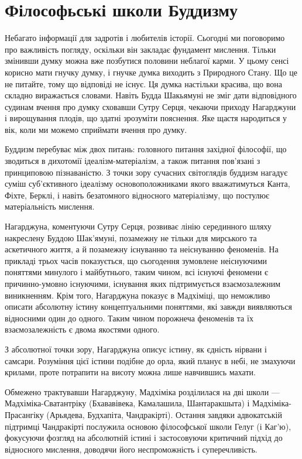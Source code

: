 \section{Філософьські школи Буддизму}

Небагато інформації для задротів і любителів історії. Сьогодні
ми поговоримо про важливість погляду, оскільки він закладає фундамент мислення.
Тільки змінивши думку можна вже позбутися половини неблагої карми.
У цьому сенсі корисно мати гнучку думку, і гнучке думка виходить з
Природного Стану. Що це не питайте, тому що відповіді не існує.
Ця думка настільки красива, що вона складно виражається словами.
Навіть Будда Шакьямуні не зміг дати відповідного судинам вчення про думку
сховавши Сутру Серця, чекаючи приходу Нагарджуни і вирощування плодів, що здатні зрозуміти пояснення.
Яке щастя народиться у вік, коли ми можемо сприймати вчення про думку.

Буддизм перебуває між двох питань: головного питання західної філософії,
що зводиться в дихотомії ідеалізм-матеріалізм, а також питання пов'язані
з принциповою пізнаваністю. З точки зору сучасних світоглядів буддизм
нагадує суміш суб'єктивного ідеалізму основоположниками якого вважатимуться
Канта, Фіхте, Берклі, і навіть безатомного відносного матеріалізму, що постулює матеріальність мислення.

Нагарджуна, коментуючи Сутру Серця, розвиває лінію серединного шляху
накреслену Буддою Шак'ямуні, позамежну не тільки для мирського та аскетичного життя,
а й позамежну існуванню та неіснуванню феноменів. На прикладі трьох часів
показується, що сьогодення зумовлене неіснуючими поняттями минулого і майбутнього,
таким чином, всі існуючі феномени є причинно-умовно існуючими, існування яких
підтримується взаємозалежним виникненням. Крім того, Нагарджуна показує в Мадхіміці,
що неможливо описати абсолютну істину концептуальними поняттями, які завжди
виявляються відносними один до одного. Таким чином порожнеча феноменів
та їх взаємозалежність є двома якостями одного.

З абсолютної точки зору, Нагарджуна описує істину, як єдність нірвани і самсари.
Розуміння цієї істини подібне до орла, який планує в небі, не змахуючи крилами,
проте потрапити на висоту можна лише навчившись махати.

Обмежено трактувавши Нагарджуну, Мадхіміка розділилася на дві школи ---
Мадхіміка-Сватантріку (Бхававівека, Камалашила, Шантаракшыта) і Мадхіміка-Прасангіку
(Арьядева, Будхапіта, Чандракірті). Остання завдяки адвокатській підтримці Чандракірті
послужила основою філософської школи Гелуг (і Каг'ю), фокусуючи фозгляд на абсолютній
істині і застосовуючи критичний підхід до відносного мислення, доводячи його неспроможність і суперечливість.

